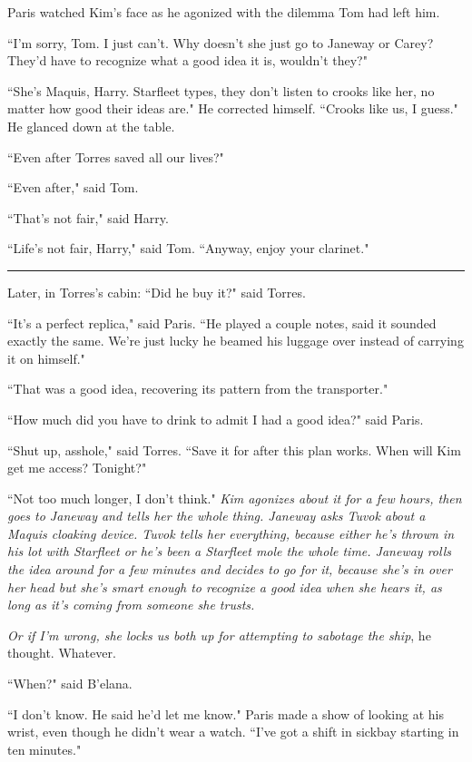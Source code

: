 \documentclass[twoside,letterpaper,12pt]{memoir}
\begin{document}
Paris watched Kim's face as he agonized with the dilemma Tom had left him. 

``I'm sorry, Tom. I just can't. Why doesn't she just go to Janeway or Carey? They'd have to recognize what a good idea it is, wouldn't they?" 

``She's Maquis, Harry. Starfleet types, they don't listen to crooks like her, no matter how good their ideas are." He corrected himself. ``Crooks like us, I guess." He glanced down at the table. 

``Even after Torres saved all our lives?" 

``Even after," said Tom. 

``That's not fair," said Harry. 

``Life's not fair, Harry," said Tom. ``Anyway, enjoy your clarinet." 

\begin{center}\rule{3cm}{0.4 pt}\end{center} 

Later, in Torres's cabin: ``Did he buy it?" said Torres. 

``It's a perfect replica," said Paris. ``He played a couple notes, said it sounded exactly the same. We're just lucky he beamed his luggage over instead of carrying it on himself."

``That was a good idea, recovering its pattern from the transporter." 

``How much did you have to drink to admit I had a good idea?" said Paris. 

``Shut up, asshole," said Torres. ``Save it for after this plan works. When will Kim get me access? Tonight?" 

``Not too much longer, I don't think." \textit{Kim agonizes about it for a few hours, then goes to Janeway and tells her the whole thing. Janeway asks Tuvok about a Maquis cloaking device. Tuvok tells her everything, because either he's thrown in his lot with Starfleet or he's been a Starfleet mole the whole time. Janeway rolls the idea around for a few minutes and decides to go for it, because she's in over her head but she's smart enough to recognize a good idea when she hears it, as long as it's coming from someone she trusts.} 

\textit{Or if I'm wrong, she locks us both up for attempting to sabotage the ship}, he thought. Whatever. 

``When?" said B'elana. 

``I don't know. He said he'd let me know." Paris made a show of looking at his wrist, even though he didn't wear a watch. ``I've got a shift in sickbay starting in ten minutes." 
\end{document}
